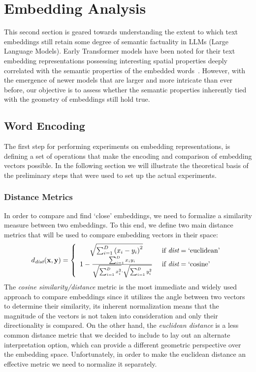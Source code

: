 \section{Embedding Analysis}\label{sec:method_embeddings}

This second section is geared towards understanding the extent to which text embeddings still retain some degree of semantic factuality in LLMs (Large Language Models).
Early Transformer models have been noted for their text embedding representations possessing interesting spatial properties deeply correlated with the semantic properties of the embedded words~\cite{allen2019,kalinowski2020}.
However, with the emergence of newer models that are larger and more intricate than ever before, our objective is to assess whether the semantic properties inherently tied with the geometry of embeddings still hold true.

\subsection{Word Encoding}

The first step for performing experiments on embedding representations, is defining a set of operations that make the encoding and comparison of embedding vectors possible.
In the following section we will illustrate the theoretical basis of the preliminary steps that were used to set up the actual experiments.

\subsubsection{Distance Metrics}

In order to compare and find `close' embeddings, we need to formalize a similarity measure between two embeddings. 
To this end, we define two main distance metrics that will be used to compare embedding vectors in their space:
\begin{equation}
    d_{\textit{dist}}(\gbm{x}, \gbm{y}) = 
    \label{eq:method_embeddings_distance}
    \left\{
    \begin{array}{cl}
        \sqrt{\sum_{i=1}^{D}{{(x_i - y_i)}^2}} &\ \text{if}\ \textit{dist} = \text{`euclidean'} \\
        1 - \frac{\sum_{i=1}^{D}{x_i y_i}}{\sqrt{\sum_{i=1}^{D}{x_i^2}} \cdot \sqrt{\sum_{i=1}^{D}{y_i^2}}} &\ \text{if}\ \textit{dist} = \text{`cosine'}
    \end{array}
    \right.
\end{equation}
The \emph{cosine similarity/distance} metric is the most immediate and widely used approach to compare embeddings since it utilizes the angle between two vectors to determine their similarity, its inherent normalization means that the magnitude of the vectors is not taken into consideration and only their directionality is compared.
On the other hand, the \emph{euclidean distance} is a less common distance metric that we decided to include to lay out an alternate interpretation option, which can provide a different geometric perspective over the embedding space.
Unfortunately, in order to make the euclidean distance an effective metric we need to normalize it separately.

